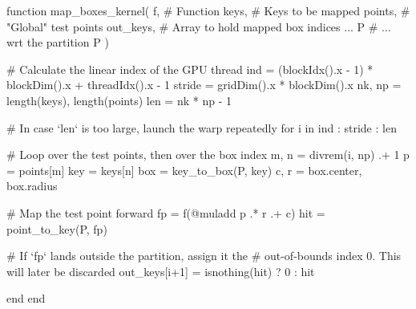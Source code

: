 \begin{jllisting}[float, floatplacement=hb!, language=julia, style=jlcodestyle, label=lst:gpu_kernel, captionpos=b, caption=GPU kernel to calculate $f(\mathcal{B})$]
    function map_boxes_kernel(
            f,          # Function
            keys,       # Keys to be mapped
            points,     # "Global" test points
            out_keys,   # Array to hold mapped box indices ...
            P           # ... wrt the partition P
        )

        # Calculate the linear index of the GPU thread
        ind = (blockIdx().x - 1) * blockDim().x + threadIdx().x - 1
        stride = gridDim().x * blockDim().x
        nk, np = length(keys), length(points)
        len = nk * np - 1

        # In case `len` is too large, launch the warp repeatedly
        for i in ind : stride : len
        
            # Loop over the test points, then over the box index
            m, n = divrem(i, np) .+ 1
            p    = points[m]
            key  = keys[n]
            box  = key_to_box(P, key)
            c, r = box.center, box.radius

            # Map the test point forward
            fp   = f(@muladd p .* r .+ c)
            hit  = point_to_key(P, fp)

            # If `fp` lands outside the partition, assign it the
            # out-of-bounds index 0. This will later be discarded
            out_keys[i+1] = isnothing(hit) ? 0 : hit

        end
    end
\end{jllisting}

